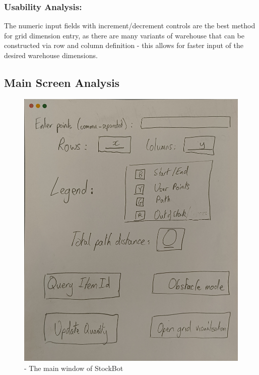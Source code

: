 \subsubsection{Usability Analysis:}

The numeric input fields with increment/decrement controls are the best method for grid dimension entry, as there are many variants of warehouse that can be constructed via row and column definition - this allows for faster input of the desired warehouse dimensions.

\newpage

\subsection{Main Screen Analysis}

\begin{figure}[!htbp]
    \centering
    \includegraphics[width=1\linewidth]{Images/GUI.jpg}
    \caption{- The main window of StockBot}
\end{figure}

\newpage




